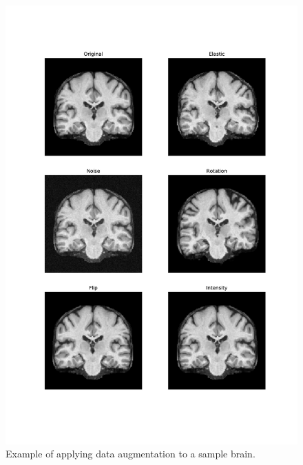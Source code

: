 \begin{figure}
    \centering
    \includegraphics[width=1.0\textwidth]{figures/dataset/data_augmentation_example.pdf}
    \caption{Example of applying data augmentation to a sample brain.}
    \label{fig:data_augmentation_example}
\end{figure}
